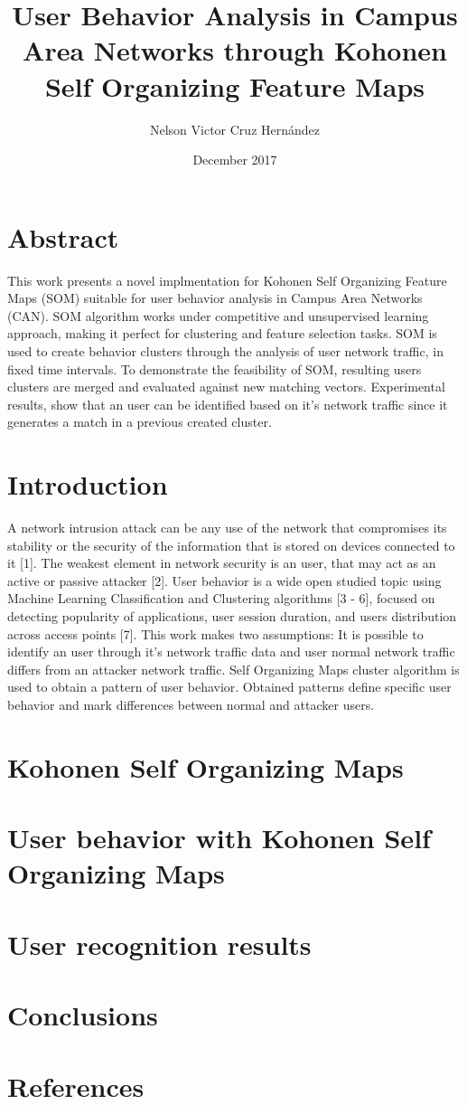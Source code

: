 \documentclass{article}
\title{User Behavior Analysis in Campus Area Networks through Kohonen Self Organizing Feature Maps}
\author{Nelson Victor Cruz Hern\'andez }
\date{December 2017}
\begin{document}
\maketitle

\section{Abstract}
This work presents a novel implmentation for Kohonen Self Organizing Feature Maps (SOM) suitable for user behavior analysis in Campus Area Networks (CAN). SOM algorithm works under competitive and unsupervised learning approach, making it perfect for clustering and feature selection tasks. SOM is used to create behavior clusters through the analysis of user network traffic, in fixed time intervals. To demonstrate the feasibility of SOM, resulting users clusters are merged and evaluated against new matching vectors. Experimental results, show that an user can be identified based on it's network traffic since it generates a match in a previous created cluster.

\section{Introduction}
A network intrusion attack can be any use of the network that compromises its stability or the security of the information that is stored on devices connected to it [1]. The weakest element in network security is an user, that may act as an active or passive attacker [2]. User behavior is a wide open studied topic using Machine Learning Classification and Clustering algorithms [3 - 6], focused on detecting popularity of applications, user session duration, and users distribution across access points [7]. This work makes two assumptions: It is possible to identify an user through it's network traffic data and user normal network traffic differs from an attacker network traffic. Self Organizing Maps cluster algorithm is used to obtain a pattern of user behavior. Obtained patterns define specific user behavior and mark differences between normal and attacker users.
\section{Kohonen Self Organizing Maps}
\section{User behavior with Kohonen Self Organizing Maps}
\section{User recognition results}
\section{Conclusions}
\section{References}
\end{document}
